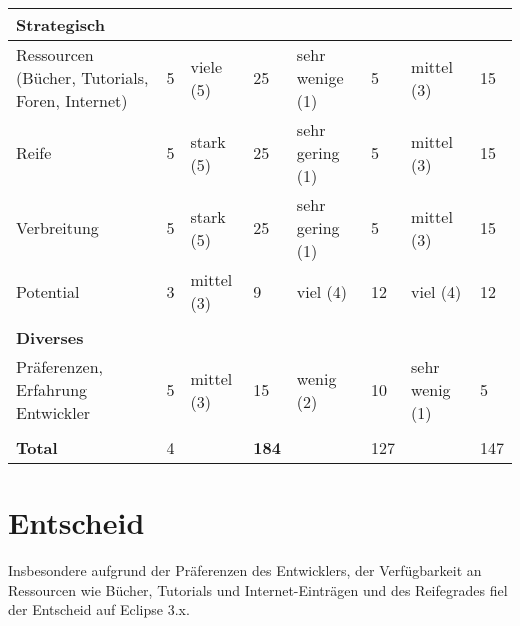 \begin{longtable}{|p{2.8cm}|p{0.7cm}|p{2.1cm}|p{0.7cm}|p{2.1cm}|p{0.7cm}|p{2.2cm}|p{0.7cm}|}
\multicolumn{8}{|l|}{\textbf{Strategisch}}\\\hline
  Ressourcen (Bücher, Tutorials, Foren, Internet) & 5 & viele (5) & 25 & sehr wenige (1) &5&mittel (3)&15 \\\hline
  Reife & 5 & stark (5) & 25 & sehr gering (1) &5&mittel (3)&15 \\\hline
  Verbreitung & 5 & stark (5) & 25 & sehr gering (1) &5&mittel (3)&15 \\\hline
  Potential & 3 & mittel (3) & 9 & viel (4)  & 12 & viel (4)&12 \\\hline
 \multicolumn{8}{|l|}{}\\
\multicolumn{8}{|l|}{\textbf{Diverses}}\\\hline
  Präferenzen, Erfahrung Entwickler & 5 & mittel (3) & 15 & wenig (2) &10&sehr wenig (1)&5 \\\hline
 \multicolumn{8}{|l|}{}\\\hline 
 \textbf{Total} & 4 & &\textbf{184}&&127& & 147 \\\hline
\end{longtable}


\section{Entscheid}
Insbesondere aufgrund der Präferenzen des Entwicklers, der Verfügbarkeit an Ressourcen wie Bücher, Tutorials und Internet-Einträgen und des Reifegrades fiel der Entscheid auf Eclipse 3.x. 





